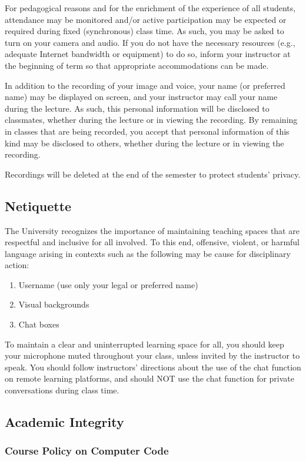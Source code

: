 \documentclass[11pt]{article}
\begin{document}
For pedagogical reasons and for the enrichment of the experience of all students, attendance may be monitored and/or active participation may be expected or required during fixed (synchronous) class time. As such, you may be asked to turn on your camera and audio. If you do not have the necessary resources (e.g., adequate Internet bandwidth or equipment) to do so, inform your instructor at the beginning of term so that appropriate accommodations can be made.

In addition to the recording of your image and voice, your name (or preferred name) may be displayed on screen, and your instructor may call your name during the lecture. As such, this personal information will be disclosed to classmates, whether during the lecture or in viewing the recording. By remaining in classes that are being recorded, you accept that personal information of this kind may be disclosed to others, whether during the lecture or in viewing the recording.

Recordings will be deleted at the end of the semester to protect students' privacy.

\subsection*{Netiquette}

The University recognizes the importance of maintaining teaching spaces that are respectful and inclusive for all involved. To this end, offensive, violent, or harmful language arising in contexts such as the following may be cause for disciplinary action:
\begin{enumerate}
\item Username (use only your legal or preferred name)
\item Visual backgrounds
\item Chat boxes
\end{enumerate}
To maintain a clear and uninterrupted learning space for all, you should keep your microphone muted throughout your class, unless invited by the instructor to speak.
You should follow instructors’ directions about the use of the chat function on remote learning platforms, and should NOT use the chat function for private conversations during class time.

\subsection*{Academic Integrity}

\subsubsection*{Course Policy on Computer Code}
\end{document}
